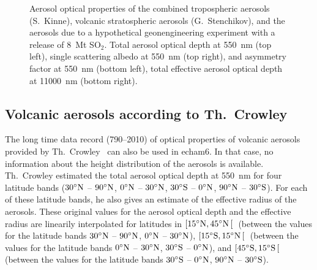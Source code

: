 \begin{appendix}
\begin{figure}[htb]
\vspace{-3.5cm}
\pctfour
{\vspace{-2.7cm}\hspace{-1cm}}
{\vspace{-2.7cm}}
{\vspace{-0.7cm}\hspace{-1cm}}
{\vspace{-0.7cm}}
\caption{Aerosol optical properties of the combined tropospheric
  aerosols (S.~Kinne), volcanic stratospheric aerosols
  (G.~Stenchikov), and the aerosols due to a hypothetical
  geonengineering experiment with a release of 8~Mt SO$_2$. Total
  aerosol optical depth at 550~nm (top left), single scattering albedo
  at 550~nm (top right), and asymmetry factor at 550~nm (bottom left),
  total effective aerosol optical depth at 11000~nm (bottom
  right).}\label{fig_hamaero_clim}
\end{figure}

\subsection{Volcanic aerosols according to Th.~Crowley}\label{cr20110323}

The long time data record (790--2010) of optical properties of
volcanic aerosols 
provided by Th.~Crowley~\cite{cro082} can also be used in echam6. In that
case, no information about the height distribution of the aerosols is
available. Th.~Crowley estimated the total aerosol optical depth at 550~nm
for four
latitude bands ($30^\circ{\rm N}$ -- $90^\circ{\rm N}$, $0^\circ{\rm
  N}$ -- $30^\circ{\rm N}$, $30^\circ{\rm S}$ -- $0^\circ{\rm N}$,
$90^\circ{\rm N}$ -- $30^\circ{\rm S}$). For each of these latitude
bands, he also gives an estimate of the effective radius of the aerosols.
These original values for the aerosol optical depth and the effective
radius are linearily interpolated for latitudes
in $\left[15^\circ{\rm N},45^\circ{\rm N}\left[\right.\right.$
(between the values for the latitude bands $30^\circ{\rm N}$ --
$90^\circ{\rm N}$, $0^\circ{\rm 
  N}$ -- $30^\circ{\rm N}$),
$\left[15^\circ{\rm S},15^\circ{\rm N}\left[\right.\right.$ (between
the values for the latitude bands $0^\circ{\rm
  N}$ -- $30^\circ{\rm N}$, $30^\circ{\rm S}$ -- $0^\circ{\rm N}$),
and $\left[45^\circ{\rm S},15^\circ{\rm S}\left[\right.\right.$
(between the values for the latitude bands $30^\circ{\rm S}$ --
$0^\circ{\rm N}$, 
$90^\circ{\rm N}$ -- $30^\circ{\rm S}$).


\end{appendix}
